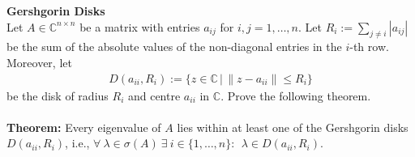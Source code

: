 \textbf{Gershgorin Disks}\\
Let $A \in \mathbb{C} ^{n \times n }$ be a matrix with entries $a_{ij}$ for $i,j = 1,\dots,n$. Let
$	R_i := \sum_{j \neq i} |a_{ij}|$
be the sum of the absolute values of the non-diagonal entries in the $i$-th row. Moreover, let
\begin{align*}
D(a_{ii}, R_i) := \lbrace z \in \mathbb{C}\,|\, \|z - a_{ii}\| \leq R_i \rbrace
\end{align*}
be the disk of radius $R_i$ and centre $a_{ii}$ in $\mathbb{C}$.
Prove the following theorem.
~\\
~\\
\textbf{Theorem:} Every eigenvalue of $A$ lies within at least one of the Gershgorin disks $D(a_{ii}, R_i)$, i.e., $\forall~\lambda\in\sigma(A)~\exists~i\in\{1,\dots,n\}:~~\lambda\in D(a_{ii}, R_i)$.